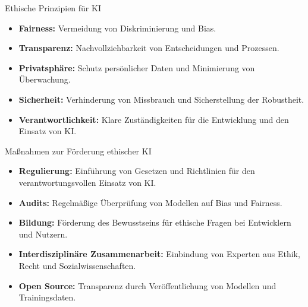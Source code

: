 \documentclass[aspectratio=1610, xcolor=dvipsnames, 9pt]{beamer}
\begin{document}
\begin{frame}{Ethische Prinzipien für KI}
  \begin{itemize}
    \item \textbf{Fairness:} Vermeidung von Diskriminierung und Bias. \\
    \item \textbf{Transparenz:} Nachvollziehbarkeit von Entscheidungen und Prozessen. \\
    \item \textbf{Privatsphäre:} Schutz persönlicher Daten und Minimierung von Überwachung. \\
    \item \textbf{Sicherheit:} Verhinderung von Missbrauch und Sicherstellung der Robustheit. \\
    \item \textbf{Verantwortlichkeit:} Klare Zuständigkeiten für die Entwicklung und den Einsatz von KI.
  \end{itemize}
\end{frame}

\begin{frame}{Maßnahmen zur Förderung ethischer KI}
  \begin{itemize}
    \item \textbf{Regulierung:} Einführung von Gesetzen und Richtlinien für den verantwortungsvollen Einsatz von KI. \\
    \item \textbf{Audits:} Regelmäßige Überprüfung von Modellen auf Bias und Fairness. \\
    \item \textbf{Bildung:} Förderung des Bewusstseins für ethische Fragen bei Entwicklern und Nutzern. \\
    \item \textbf{Interdisziplinäre Zusammenarbeit:} Einbindung von Experten aus Ethik, Recht und Sozialwissenschaften. \\
    \item \textbf{Open Source:} Transparenz durch Veröffentlichung von Modellen und Trainingsdaten. \\
  \end{itemize}
\end{frame}
\end{document}
